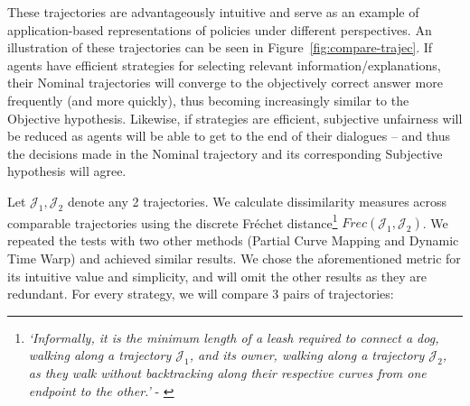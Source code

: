\documentclass[acmsmall]{custom-arxiv}  %
\begin{document}
These trajectories are advantageously intuitive and serve as an example of application-based representations of policies under different perspectives. An illustration of these trajectories can be seen in Figure~\ref{fig:compare-trajec}. If agents have efficient strategies for selecting relevant information/explanations, their Nominal trajectories will converge to the objectively correct answer more frequently (and more quickly), thus becoming increasingly similar to the Objective hypothesis. Likewise, if strategies are efficient, subjective unfairness will be reduced as agents will be able to get to the end of their dialogues -- and thus the decisions made in the Nominal trajectory and its corresponding Subjective hypothesis will agree.

Let $\mathcal{J}_1, \mathcal{J}_2$ denote any 2 trajectories. We calculate dissimilarity measures across comparable trajectories using the discrete Fréchet distance\footnote{\textit{`Informally, it is the minimum length of a leash required to connect a dog, walking along a trajectory $\mathcal{J}_1$, and its owner, walking along a trajectory $\mathcal{J}_2$, as they walk without backtracking along their respective curves from one endpoint to the other.'} - \citet{Agarwal2014ComputingTime}} $Frec(\mathcal{J}_1, \mathcal{J}_2)$. We repeated the tests with two other methods (Partial Curve Mapping and Dynamic Time Warp) and achieved similar results. We chose the aforementioned metric for its intuitive value and simplicity, and will omit the other results as they are redundant. For every strategy, we will compare 3 pairs of trajectories:
\end{document}
